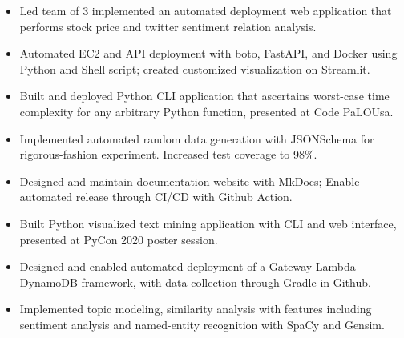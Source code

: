 \begin{itemize}
\item Led team of 3 implemented an automated deployment web application that performs stock price and twitter sentiment relation analysis.
\item Automated EC2 and API deployment with boto, FastAPI, and Docker using Python and Shell script; created customized visualization on Streamlit.
\end{itemize}
\smallskip
{}
\begin{itemize}
\item Built and deployed Python CLI application that ascertains worst-case time complexity for any arbitrary Python function, presented at Code PaLOUsa.
\item Implemented automated random data generation with JSONSchema for rigorous-fashion experiment. Increased test coverage to 98\%.
\item Designed and maintain documentation website with MkDocs; Enable automated release through CI/CD with Github Action.
\end{itemize}
\smallskip
{}
\begin{itemize}
\item Built Python visualized text mining application with CLI and web interface, presented at PyCon 2020 poster session.
\item Designed and enabled automated deployment of a Gateway-Lambda-DynamoDB framework, with data collection through Gradle in Github.
\item Implemented topic modeling, similarity analysis with features including sentiment analysis and named-entity recognition with SpaCy and Gensim.
\end{itemize}
\smallskip
\smallskip

